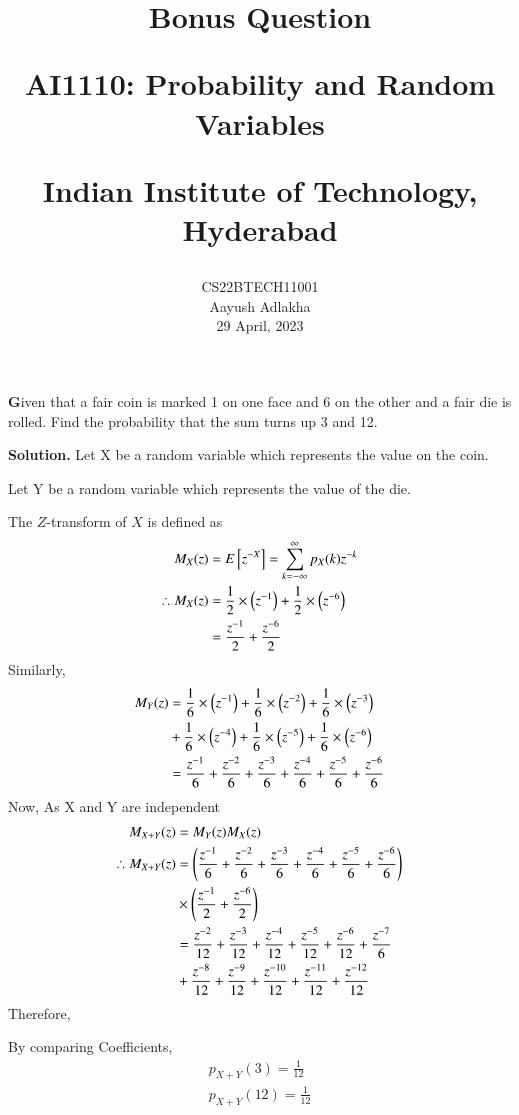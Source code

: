 \documentclass[journal,12pt,twocolumn]{IEEEtran}
\begin{document}
\let\vec\mathbf


\vspace{3cm}

\title{
	Bonus Question
 
	\Large AI1110: Probability and Random Variables
 
	\Large Indian Institute of Technology, Hyderabad
}
\author{
	CS22BTECH11001
	
	Aayush Adlakha
 
	29 April, 2023
}






\maketitle

\newpage


\bigskip
\renewcommand{\thefigure}{\theenumi}
\renewcommand{\thetable}{\theenumi}
\textbf
Given that a fair coin is marked 1 on one face and 6 on the other and a fair die is rolled. Find the probability that the sum turns up 3 and 12.

\textbf{Solution.}
Let X be a random variable which represents the value on the coin.

Let Y be a random variable which represents the value of the die.

The $Z$-transform of $X$ is defined as
\begin{align}
M_X(z) &= E{}\left[z^{-X}\right] = \sum_{k=-\infty}^{\infty}p_X(k)z^{-k}\\
\therefore M_X(z) &= \frac{1}{2} \times \left(z^{-1}\right) + \frac{1}{2} \times \left(z^{-6}\right)\\
&= \frac{z^{-1}}{2} + \frac{z^{-6}}{2}
\end{align}
Similarly,
\begin{align}
M_Y(z) &= \frac{1}{6} \times \left(z^{-1}\right) + \frac{1}{6} \times \left(z^{-2}\right) + \frac{1}{6} \times \left(z^{-3}\right)\\ &+ \frac{1}{6} \times \left(z^{-4}\right) + \frac{1}{6} \times \left(z^{-5}\right) + \frac{1}{6} \times \left(z^{-6}\right)\nonumber\\
&=\frac{z^{-1}}{6} + \frac{z^{-2}}{6} + \frac{z^{-3}}{6} + \frac{z^{-4}}{6}  + \frac{z^{-5}}{6} + \frac{z^{-6}}{6} 
\end{align}
Now, As X and Y are independent
\begin{align}
M_{X+Y}(z) &= M_Y(z)M_X(z) \\
\therefore M_{X+Y}(z) &= \left(\frac{z^{-1}}{6} + \frac{z^{-2}}{6} + \frac{z^{-3}}{6} + \frac{z^{-4}}{6}  + \frac{z^{-5}}{6} + \frac{z^{-6}}{6}  \right)\\
&\times \left(\frac{z^{-1}}{2}  + \frac{z^{-6}}{2} \right)\nonumber\\
&=\frac{z^{-2}}{12} + \frac{z^{-3}}{12} + \frac{z^{-4}}{12}  + \frac{z^{-5}}{12} + \frac{z^{-6}}{12} +\frac{z^{-7}}{6} \\
&+\frac{z^{-8}}{12} + \frac{z^{-9}}{12} + \frac{z^{-10}}{12}  + \frac{z^{-11}}{12} + \frac{z^{-12}}{12}
\end{align}
Therefore, 

By comparing Coefficients,
\begin{align}
    p_{X+Y}(3) = \frac{1}{12}\\
    p_{X+Y}(12) = \frac{1}{12}
\end{align}
\end{document}
